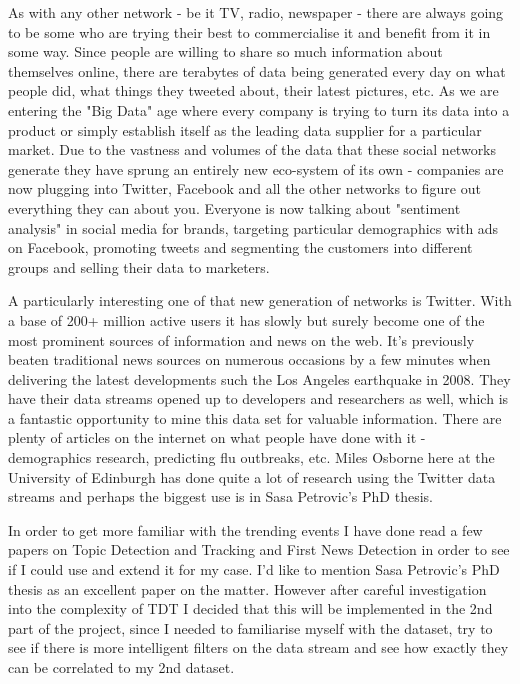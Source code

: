 \documentclass[minf,frontabs,twoside,singlespacing,parskip]{infthesis}
\begin{document}
As with any other network - be it TV, radio, newspaper - there are always going to be some who are trying their best to commercialise it and benefit from it in some way. Since people are willing to share so much information about themselves online, there are terabytes of data being generated every day on what people did, what things they tweeted about, their latest pictures, etc. As we are entering the "Big Data" age where every company is trying to turn its data into a product or simply establish itself as the leading data supplier for a particular market. Due to the vastness and volumes of the data that these social networks generate they have sprung an entirely new eco-system of its own - companies are now plugging into Twitter, Facebook and all the other networks to figure out everything they can about you. Everyone is now talking about "sentiment analysis" in social media for brands, targeting particular demographics with ads on Facebook, promoting tweets and segmenting the customers into different groups and selling their data to marketers.


A particularly interesting one of that new generation of networks is Twitter. With a base of 200+ million active users it has slowly but surely become one of the most prominent sources of information and news on the web. It's previously beaten traditional news sources on numerous occasions by a few minutes when delivering the latest developments such the Los Angeles earthquake in 2008. \cite{TwitterNewsWire} They have their data streams opened up to developers and researchers as well, which is a fantastic opportunity to mine this data set for valuable information. There are plenty of articles on the internet on what people have done with it - demographics research, predicting flu outbreaks, etc. \cite{TwitterResearch} Miles Osborne here at the University of Edinburgh has done quite a lot of research using the Twitter data streams  \cite{Miles} and perhaps the biggest use is in Sasa Petrovic's PhD thesis. \cite{Petrovic2012}


In order to get more familiar with the trending events I have done read a few papers on Topic Detection and Tracking and First News Detection in order to see if I could use and extend it for my case. I'd like to mention Sasa Petrovic's PhD thesis as an excellent paper on the matter. \cite{Petrovic2012} However after careful investigation into the complexity of TDT I decided that this will be implemented in the 2nd part of the project, since I needed to familiarise myself with the dataset, try to see if there is more intelligent filters on the data stream and see how exactly they can be correlated to my 2nd dataset.
\end{document}
